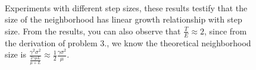 \documentclass[12pt,a4paper]{article}
\begin{document}
\begin{figure}
	\centering
	\\ %
	\centering
	
	\caption{Experiments with different step sizes,  these results testify that the size of the neighborhood has linear growth relationship with step size. From the results, you can also observe  that $\frac{T}{E}\approx 2$, since from the derivation of problem 3., we know the theoretical neighborhood size is $\frac{\gamma^2\sigma^2}{\frac{2\gamma \mu L}{\mu+L}}\approx \frac{1}{2}\frac{\gamma \sigma^2}{\mu}$. } %
	\label{img2}
\end{figure}



	
\end{document}
